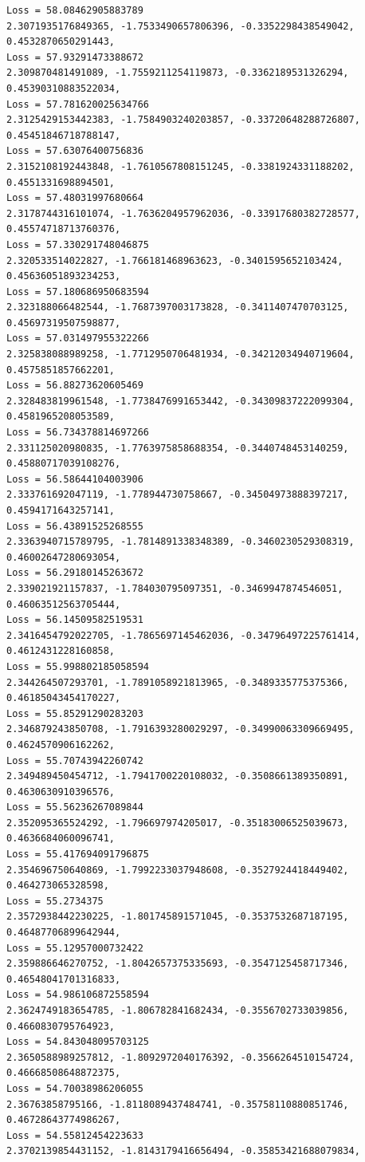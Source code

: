 \documentclass[11pt]{article}
\begin{document}
\begin{Verbatim}[commandchars=\\\{\}]
Loss = 58.08462905883789
2.3071935176849365, -1.7533490657806396, -0.3352298438549042,
0.4532870650291443,
Loss = 57.93291473388672
2.309870481491089, -1.7559211254119873, -0.3362189531326294,
0.45390310883522034,
Loss = 57.781620025634766
2.3125429153442383, -1.7584903240203857, -0.33720648288726807,
0.45451846718788147,
Loss = 57.63076400756836
2.3152108192443848, -1.7610567808151245, -0.3381924331188202,
0.4551331698894501,
Loss = 57.48031997680664
2.3178744316101074, -1.7636204957962036, -0.33917680382728577,
0.45574718713760376,
Loss = 57.330291748046875
2.320533514022827, -1.766181468963623, -0.3401595652103424, 0.45636051893234253,
Loss = 57.180686950683594
2.323188066482544, -1.7687397003173828, -0.3411407470703125,
0.45697319507598877,
Loss = 57.031497955322266
2.325838088989258, -1.7712950706481934, -0.34212034940719604,
0.4575851857662201,
Loss = 56.88273620605469
2.328483819961548, -1.7738476991653442, -0.34309837222099304,
0.4581965208053589,
Loss = 56.734378814697266
2.331125020980835, -1.7763975858688354, -0.3440748453140259,
0.45880717039108276,
Loss = 56.58644104003906
2.333761692047119, -1.778944730758667, -0.34504973888397217, 0.4594171643257141,
Loss = 56.43891525268555
2.3363940715789795, -1.7814891338348389, -0.3460230529308319,
0.46002647280693054,
Loss = 56.29180145263672
2.339021921157837, -1.784030795097351, -0.3469947874546051, 0.46063512563705444,
Loss = 56.14509582519531
2.3416454792022705, -1.7865697145462036, -0.34796497225761414,
0.4612431228160858,
Loss = 55.998802185058594
2.344264507293701, -1.7891058921813965, -0.3489335775375366,
0.46185043454170227,
Loss = 55.85291290283203
2.346879243850708, -1.7916393280029297, -0.34990063309669495,
0.4624570906162262,
Loss = 55.70743942260742
2.349489450454712, -1.7941700220108032, -0.3508661389350891, 0.4630630910396576,
Loss = 55.56236267089844
2.352095365524292, -1.796697974205017, -0.35183006525039673, 0.4636684060096741,
Loss = 55.417694091796875
2.354696750640869, -1.7992233037948608, -0.3527924418449402, 0.464273065328598,
Loss = 55.2734375
2.3572938442230225, -1.801745891571045, -0.3537532687187195,
0.46487706899642944,
Loss = 55.12957000732422
2.359886646270752, -1.8042657375335693, -0.3547125458717346,
0.46548041701316833,
Loss = 54.986106872558594
2.3624749183654785, -1.806782841682434, -0.3556702733039856, 0.4660830795764923,
Loss = 54.843048095703125
2.3650588989257812, -1.8092972040176392, -0.3566264510154724,
0.46668508648872375,
Loss = 54.70038986206055
2.36763858795166, -1.8118089437484741, -0.35758110880851746,
0.46728643774986267,
Loss = 54.55812454223633
2.3702139854431152, -1.8143179416656494, -0.35853421688079834,

\end{Verbatim}
\end{document}
